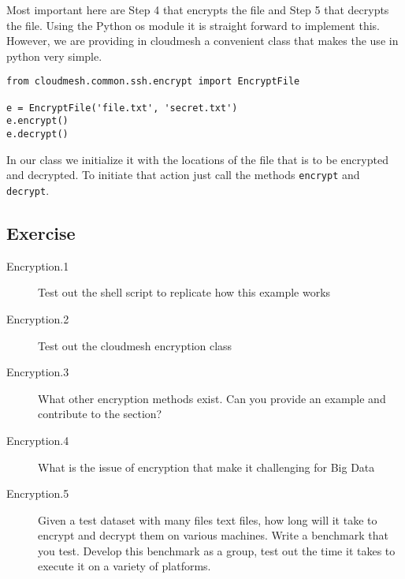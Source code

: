 Most important here are Step 4 that encrypts the file and Step 5 that
decrypts the file. Using the Python os module it is straight forward
to implement this. However, we are providing in cloudmesh a convenient
class that makes the use in python very simple.

\begin{verbatim}
from cloudmesh.common.ssh.encrypt import EncryptFile

e = EncryptFile('file.txt', 'secret.txt')
e.encrypt()
e.decrypt()
\end{verbatim}

In our class we initialize it with the locations of the file that is
to be encrypted and decrypted. To initiate that action just call the
methods \verb|encrypt| and \verb|decrypt|.


\subsection{Exercise}

\begin{description}

\item[Encryption.1] Test out the shell script to replicate how this
  example works

\item[Encryption.2] Test out the cloudmesh encryption class

\item[Encryption.3] What other encryption methods exist. Can you
  provide an example and contribute to the section?

\item[Encryption.4] What is the issue of encryption that make it
  challenging for Big Data
 
\item[Encryption.5] Given a test dataset with many files text files,
  how long will it take to encrypt and decrypt them on various
  machines. Write a benchmark that you test. Develop this benchmark as
  a group, test out the time it takes to execute it on a variety of
  platforms.




\end{description}